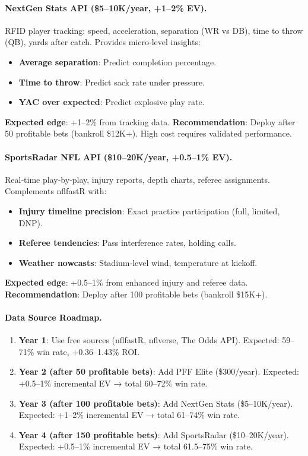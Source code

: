 \paragraph{NextGen Stats API (\$5--10K/year, +1--2\% EV).}
RFID player tracking: speed, acceleration, separation (WR vs DB), time to throw (QB), yards after catch. Provides micro‑level insights:
\begin{itemize}
\item \textbf{Average separation}: Predict completion percentage.
\item \textbf{Time to throw}: Predict sack rate under pressure.
\item \textbf{YAC over expected}: Predict explosive play rate.
\end{itemize}
\textbf{Expected edge}: +1--2\% from tracking data. \textbf{Recommendation}: Deploy after 50 profitable bets (bankroll \$12K+). High cost requires validated performance.

\paragraph{SportsRadar NFL API (\$10--20K/year, +0.5--1\% EV).}
Real‑time play‑by‑play, injury reports, depth charts, referee assignments. Complements nflfastR with:
\begin{itemize}
\item \textbf{Injury timeline precision}: Exact practice participation (full, limited, DNP).
\item \textbf{Referee tendencies}: Pass interference rates, holding calls.
\item \textbf{Weather nowcasts}: Stadium‑level wind, temperature at kickoff.
\end{itemize}
\textbf{Expected edge}: +0.5--1\% from enhanced injury and referee data. \textbf{Recommendation}: Deploy after 100 profitable bets (bankroll \$15K+).

\paragraph{Data Source Roadmap.}
\begin{enumerate}
\item \textbf{Year 1}: Use free sources (nflfastR, nflverse, The Odds API). Expected: 59--71\% win rate, +0.36--1.43\% ROI.
\item \textbf{Year 2 (after 50 profitable bets)}: Add PFF Elite (\$300/year). Expected: +0.5--1\% incremental EV → total 60--72\% win rate.
\item \textbf{Year 3 (after 100 profitable bets)}: Add NextGen Stats (\$5--10K/year). Expected: +1--2\% incremental EV → total 61--74\% win rate.
\item \textbf{Year 4 (after 150 profitable bets)}: Add SportsRadar (\$10--20K/year). Expected: +0.5--1\% incremental EV → total 61.5--75\% win rate.
\end{enumerate}

